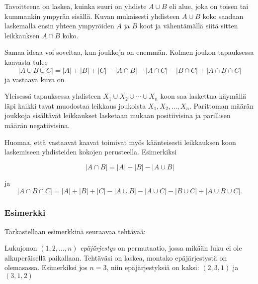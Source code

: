 Tavoitteena on laskea, kuinka suuri on yhdiste $A \cup B$
eli alue, joka on toisen tai kummankin ympyrän sisällä.
Kuvan mukaisesti yhdisteen $A \cup B$ koko
saadaan laskemalla ensin yhteen ympyröiden $A$ ja $B$ koot
ja vähentämällä siitä sitten leikkauksen $A \cap B$ koko.

Samaa ideaa voi soveltaa, kun joukkoja on enemmän.
Kolmen joukon tapauksessa kaavasta tulee
\[ |A \cup B \cup C| = |A| + |B| + |C| - |A \cap B|  - |A \cap C|  - |B \cap C| + |A \cap B \cap C| \]
ja vastaava kuva on

\begin{center}
\end{center}

Yleisessä tapauksessa yhdisteen $X_1 \cup X_2 \cup \cdots \cup X_n$
koon saa laskettua käymällä läpi kaikki tavat muodostaa
leikkaus joukoista $X_1,X_2,\ldots,X_n$.
Parittoman määrän joukkoja sisältävät leikkaukset
lasketaan mukaan positiivisina ja
parillisen määrän negatiivisina.

Huomaa, että vastaavat kaavat toimivat myös käänteisesti
leikkauksen koon laskemiseen yhdisteiden kokojen perusteella.
Esimerkiksi

\[ |A \cap B| = |A| + |B| - |A \cup B|\]

ja
\[ |A \cap B \cap C| = |A| + |B| + |C| - |A \cup B|  - |A \cup C|  - |B \cup C| + |A \cup B \cup C| .\]

\subsubsection{Esimerkki}

Tarkastellaan esimerkkinä seuraavaa tehtävää:

\begin{task}
Lukujonon $(1,2,\ldots,n)$
\textit{epäjärjestys} on permutaatio,
jossa mikään luku ei ole alkuperäisellä paikallaan.
Tehtäväsi on laskea, montako epäjärjestystä on olemasassa.
Esimerkiksi jos $n=3$, niin epäjärjestyksiä on kaksi: $(2,3,1)$ ja $(3,1,2)$
\end{task}

